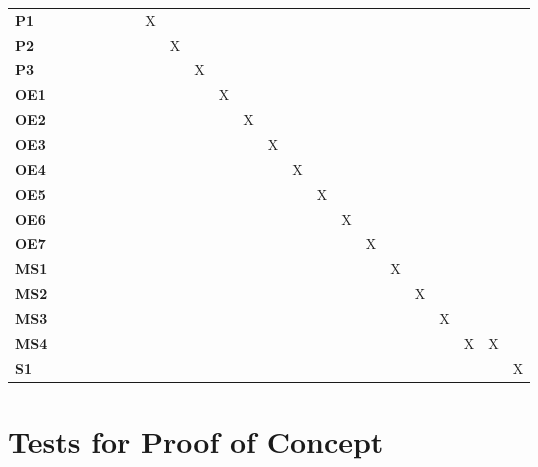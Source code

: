 \documentclass[12pt, titlepage]{article}
\begin{document}
\begin{landscape}
\begin{table}[H]
\begin{adjustbox}{width=\paperwidth}
\begin{tabular}{l|cccccccccccccccccccc}
        \textbf{P1}     & ~ & ~ & ~ & ~ & X & ~ & ~ & ~ & ~ & ~ & ~ & ~ & ~ & ~ & ~ & ~ & ~ & ~ & ~ & ~\\
        \textbf{P2}     & ~ & ~ & ~ & ~ & ~ & X & ~ & ~ & ~ & ~ & ~ & ~ & ~ & ~ & ~ & ~ & ~ & ~ & ~ & ~\\
        \textbf{P3}     & ~ & ~ & ~ & ~ & ~ & ~ & X & ~ & ~ & ~ & ~ & ~ & ~ & ~ & ~ & ~ & ~ & ~ & ~ & ~\\
        \textbf{OE1}    & ~ & ~ & ~ & ~ & ~ & ~ & ~ & X & ~ & ~ & ~ & ~ & ~ & ~ & ~ & ~ & ~ & ~ & ~ & ~\\
        \textbf{OE2}    & ~ & ~ & ~ & ~ & ~ & ~ & ~ & ~ & X & ~ & ~ & ~ & ~ & ~ & ~ & ~ & ~ & ~ & ~ & ~\\
        \textbf{OE3}    & ~ & ~ & ~ & ~ & ~ & ~ & ~ & ~ & ~ & X & ~ & ~ & ~ & ~ & ~ & ~ & ~ & ~ & ~ & ~\\
        \textbf{OE4}    & ~ & ~ & ~ & ~ & ~ & ~ & ~ & ~ & ~ & ~ & X & ~ & ~ & ~ & ~ & ~ & ~ & ~ & ~ & ~\\
        \textbf{OE5}    & ~ & ~ & ~ & ~ & ~ & ~ & ~ & ~ & ~ & ~ & ~ & X & ~ & ~ & ~ & ~ & ~ & ~ & ~ & ~\\
        \textbf{OE6}    & ~ & ~ & ~ & ~ & ~ & ~ & ~ & ~ & ~ & ~ & ~ & ~ & X & ~ & ~ & ~ & ~ & ~ & ~ & ~\\
        \textbf{OE7}    & ~ & ~ & ~ & ~ & ~ & ~ & ~ & ~ & ~ & ~ & ~ & ~ & ~ & X & ~ & ~ & ~ & ~ & ~ & ~\\
        \textbf{MS1}    & ~ & ~ & ~ & ~ & ~ & ~ & ~ & ~ & ~ & ~ & ~ & ~ & ~ & ~ & X & ~ & ~ & ~ & ~ & ~\\
        \textbf{MS2}    & ~ & ~ & ~ & ~ & ~ & ~ & ~ & ~ & ~ & ~ & ~ & ~ & ~ & ~ & ~ & X & ~ & ~ & ~ & ~\\
        \textbf{MS3}    & ~ & ~ & ~ & ~ & ~ & ~ & ~ & ~ & ~ & ~ & ~ & ~ & ~ & ~ & ~ & ~ & X & ~ & ~ & ~\\
        \textbf{MS4}    & ~ & ~ & ~ & ~ & ~ & ~ & ~ & ~ & ~ & ~ & ~ & ~ & ~ & ~ & ~ & ~ & ~ & X & X & ~\\
        \textbf{S1}     & ~ & ~ & ~ & ~ & ~ & ~ & ~ & ~ & ~ & ~ & ~ & ~ & ~ & ~ & ~ & ~ & ~ & ~ & ~ & X\\
    \end{tabular}
    \end{adjustbox}
    \label{Traceability Matrix: Non-Functional Requirement}
\end{table}
\end{landscape}

\section{Tests for Proof of Concept}
\end{document}
